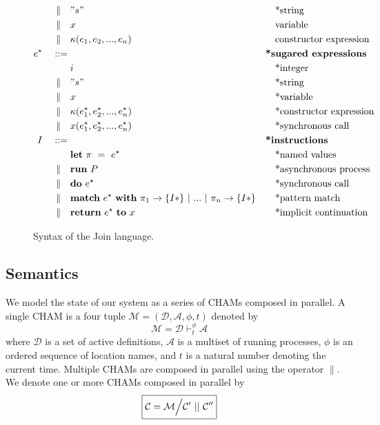 \begin{figure}
\begin{align*}
\mid\kern-1pt\mid\quad& " s "         && \quad\textrm{*string} \\
\mid\kern-1pt\mid\quad& x               && \quad\textrm{variable} \\
\mid\kern-1pt\mid\quad& \kappa(e_1, e_2, ..., e_n)
                           && \quad\textrm{constructor expression} \\
e^\star\quad ::={}&         && \textbf{*sugared expressions} \\
         & i               && \quad\textrm{*integer} \\
\mid\kern-1pt\mid\quad& " s "         && \quad\textrm{*string} \\
\mid\kern-1pt\mid\quad& x               && \quad\textrm{*variable} \\
\mid\kern-1pt\mid\quad& \kappa(e^\star_1, e^\star_2, ..., e^\star_n)
                           && \quad\textrm{*constructor expression} \\
\mid\kern-1pt\mid\quad& x(e^\star_1, e^\star_2, ..., e^\star_ n)
                           && \quad\textrm{*synchronous call} \\
I\quad ::={}&              && \textbf{*instructions} \\
         & \mathbf{let}~\pi~=~e^\star
                           && \quad\textrm{*named values} \\
\mid\kern-1pt\mid\quad& \mathbf{run}~P  && \quad\textrm{*asynchronous process} \\
\mid\kern-1pt\mid\quad& \mathbf{do}~e^\star && \quad\textrm{*synchronous call} \\
\mid\kern-1pt\mid\quad& \textbf{match}~e^\star~\textbf{with}~\pi_1
               \rightarrow \{ I* \} ~|~ ... ~|~ \pi_n \rightarrow \{ I* \}
                           && \quad\textrm{*pattern match} \\
\mid\kern-1pt\mid\quad& \textbf{return}~e^\star~\textbf{to}~x
                           && \quad\textrm{*implicit continuation}
\end{align*}
\caption{Syntax of the Join language.\label{fig:syntax}}
\end{figure}


\subsection{Semantics}

We model the state of our system as a series of CHAMs composed in parallel. A
single CHAM is a four tuple $\mathcal{M} = (\mathcal{D}, \mathcal{A}, \phi, t)$
denoted by
\begin{equation*}
 \boxed{\mathcal{M} = \mathcal{D} \vdash^\phi_t \mathcal{A}}
\end{equation*}
where $\mathcal{D}$ is a set of active definitions, $\mathcal{A}$ is a multiset
of running processes, $\phi$ is an ordered sequence of location names, and $t$ is
a natural number denoting the current time. Multiple CHAMs are composed in
parallel using the operator $\parallel$. We denote one or more CHAMs composed
in parallel by
\begin{equation*}
 \boxed{\mathcal{C} = \mathcal{M} \Big\slash \mathcal{C}'~||~\mathcal{C}''}
\end{equation*}

